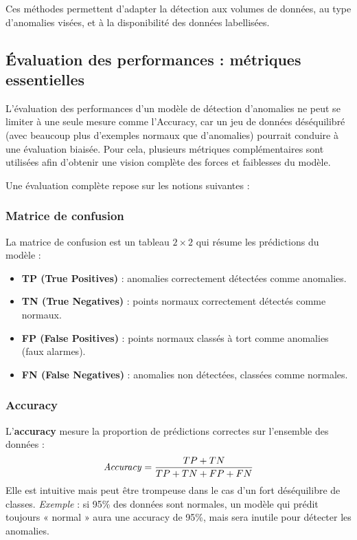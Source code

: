 \documentclass[a4paper,12pt]{report}
\begin{document}
Ces méthodes permettent d’adapter la détection aux volumes de données, au type d’anomalies visées, et à la disponibilité des données labellisées.

\subsection{Évaluation des performances : métriques essentielles}

L’évaluation des performances d’un modèle de détection d’anomalies ne peut se limiter à une seule mesure comme l’Accuracy, car un jeu de données déséquilibré (avec beaucoup plus d’exemples normaux que d’anomalies) pourrait conduire à une évaluation biaisée.  
Pour cela, plusieurs métriques complémentaires sont utilisées afin d’obtenir une vision complète des forces et faiblesses du modèle.

Une évaluation complète repose sur les notions suivantes \cite{nobre2023}:

\subsubsection{Matrice de confusion}

La matrice de confusion est un tableau $2 \times 2$ qui résume les prédictions du modèle :
\begin{itemize}
    \item \textbf{TP (True Positives)} : anomalies correctement détectées comme anomalies.
    \item \textbf{TN (True Negatives)} : points normaux correctement détectés comme normaux.
    \item \textbf{FP (False Positives)} : points normaux classés à tort comme anomalies (faux alarmes).
    \item \textbf{FN (False Negatives)} : anomalies non détectées, classées comme normales.
\end{itemize}

\subsubsection{Accuracy}

L’\textbf{accuracy} mesure la proportion de prédictions correctes sur l’ensemble des données :
\[
\text{\textit{Accuracy}} = \frac{TP + TN}{TP + TN + FP + FN}
\]
Elle est intuitive mais peut être trompeuse dans le cas d’un fort déséquilibre de classes.  
\textit{Exemple} : si 95\% des données sont normales, un modèle qui prédit toujours « normal » aura une accuracy de 95\%, mais sera inutile pour détecter les anomalies.
\end{document}

